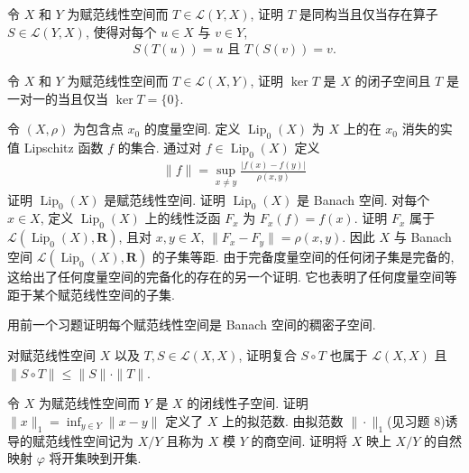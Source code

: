 \documentclass[../../main.tex]{subfiles}
\begin{document}
\begin{exercise}\label{exercise:ch13-15}
令 $X$ 和 $Y$ 为赋范线性空间而 $T\in\mathcal{L}(Y,X)$, 证明 $T$ 是同构当且仅当存在算子 $S\in\mathcal{L}(Y,X)$, 使得对每个 $u\in X$ 与 $v\in Y$,
\begin{align*}
S(T(u))=u\text{ 且 }T(S(v))=v.
\end{align*}
\end{exercise}

\begin{exercise}\label{exercise:ch13-16}
令 $X$ 和 $Y$ 为赋范线性空间而 $T\in\mathcal{L}(X,Y)$, 证明 $\ker T$ 是 $X$ 的闭子空间且 $T$ 是一对一的当且仅当 $\ker T=\{0\}$.
\end{exercise}

\begin{exercise}\label{exercise:ch13-17}
令 $(X,\rho)$ 为包含点 $x_{0}$ 的度量空间. 定义 $\operatorname{Lip}_{0}(X)$ 为 $X$ 上的在 $x_{0}$ 消失的实值 Lipschitz 函数 $f$ 的集合. 通过对 $f\in\operatorname{Lip}_{0}(X)$ 定义
\begin{align*}
\|f\|=\sup_{x\neq y}\frac{|f(x)-f(y)|}{\rho(x,y)}
\end{align*}
证明 $\operatorname{Lip}_{0}(X)$ 是赋范线性空间. 证明 $\operatorname{Lip}_{0}(X)$ 是 Banach 空间. 对每个 $x\in X$, 定义 $\operatorname{Lip}_{0}(X)$ 上的线性泛函 $F_{x}$ 为 $F_{x}(f)=f(x)$. 证明 $F_{x}$ 属于 $\mathcal{L}(\operatorname{Lip}_{0}(X),\mathbf{R})$, 且对 $x,y\in X$, $\|F_{x}-F_{y}\|=\rho(x,y)$. 因此 $X$ 与 Banach 空间 $\mathcal{L}(\operatorname{Lip}_{0}(X),\mathbf{R})$ 的子集等距. 由于完备度量空间的任何闭子集是完备的, 这给出了任何度量空间的完备化的存在的另一个证明. 它也表明了任何度量空间等距于某个赋范线性空间的子集.
\end{exercise}

\begin{exercise}\label{exercise:ch13-18}
用前一个习题证明每个赋范线性空间是 Banach 空间的稠密子空间.
\end{exercise}

\begin{exercise}\label{exercise:ch13-19}
对赋范线性空间 $X$ 以及 $T,S\in\mathcal{L}(X,X)$, 证明复合 $S\circ T$ 也属于 $\mathcal{L}(X,X)$ 且 $\|S\circ T\|\leqslant\|S\|\cdot\|T\|$.
\end{exercise}

\begin{exercise}\label{exercise:ch13-20}
令 $X$ 为赋范线性空间而 $Y$ 是 $X$ 的闭线性子空间. 证明 $\|x\|_{1}=\inf_{y\in Y}\|x-y\|$ 定义了 $X$ 上的拟范数. 由拟范数 $\|\cdot\|_{1}$(见习题 8)诱导的赋范线性空间记为 $X/Y$ 且称为 $X$ 模 $Y$ 的商空间. 证明将 $X$ 映上 $X/Y$ 的自然映射 $\varphi$ 将开集映到开集.
\end{exercise}
\end{document}
